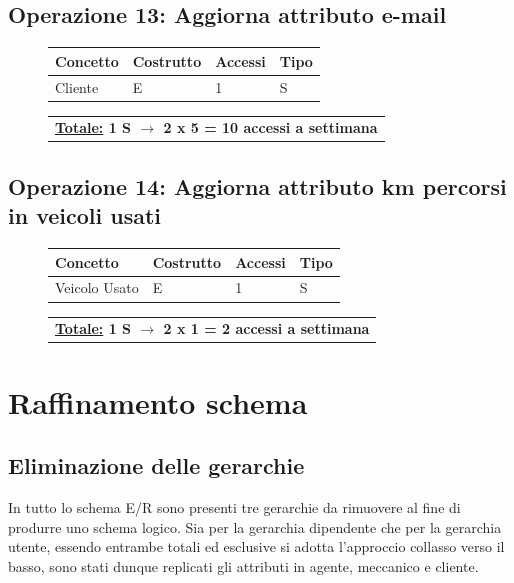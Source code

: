 \documentclass[a4paper,12pt]{report}
\begin{document}
\subsection*{Operazione 13: Aggiorna attributo e-mail}
\begin{figure}[H]
	\centering
	\begin{tabular}{L{4.5cm}C{2cm}C{4.5cm}C{2cm}}
		\rule[-2mm]{0mm}{0.6cm}{}
		\textbf{Concetto} & \textbf{Costrutto} &\textbf{Accessi} & \textbf{Tipo} \\
		\hline\rule[-2mm]{0mm}{0.65cm}{}
		Cliente & E & 1 & S \\
	\end{tabular}
	
	\begin{tabular}{C{14.3cm}}
		\rule[-3mm]{0mm}{0.85cm}{}	
		 \textbf{\underline{Totale:} 1 S $\to$ 2 x 5 = 10 accessi a settimana}
	\end{tabular}
\end{figure}

\subsection*{Operazione 14: Aggiorna attributo km percorsi in veicoli usati}
\begin{figure}[H]
	\centering
	\begin{tabular}{L{4.5cm}C{2cm}C{4.5cm}C{2cm}}
		\rule[-2mm]{0mm}{0.6cm}{}
		\textbf{Concetto} & \textbf{Costrutto} &\textbf{Accessi} & \textbf{Tipo} \\
		\hline\rule[-2mm]{0mm}{0.65cm}{}
		Veicolo Usato & E & 1 & S \\
	\end{tabular}
	
	\begin{tabular}{C{14.3cm}}
		\rule[-3mm]{0mm}{0.85cm}{}	
		 \textbf{\underline{Totale:} 1 S $\to$ 2 x 1 = 2 accessi a settimana}
	\end{tabular}
\end{figure}

\section{Raffinamento schema}
\subsection*{Eliminazione delle gerarchie}
In tutto lo schema E/R sono presenti tre gerarchie da rimuovere al fine di produrre uno schema logico. 
%
Sia per la gerarchia dipendente che per la gerarchia utente, essendo entrambe totali ed esclusive si adotta l’approccio collasso 
%
verso il basso, sono stati dunque replicati gli attributi in agente, meccanico e cliente.
\end{document}
